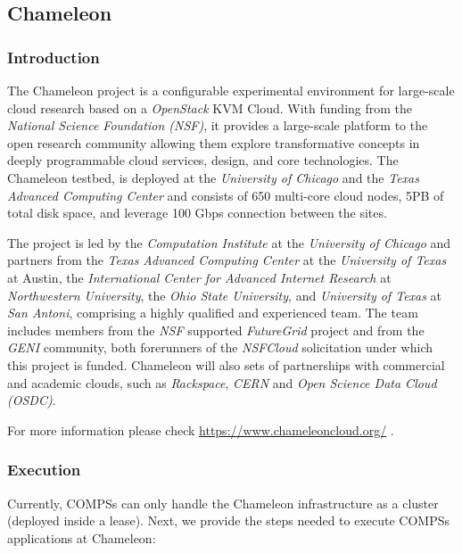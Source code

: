 \subsection{Chameleon}

\subsubsection{Introduction}

The Chameleon project is a configurable experimental environment for large-scale cloud research based on a \textit{OpenStack} 
KVM Cloud. With funding from the \textit{National Science Foundation (NSF)}, it provides a large-scale platform to the open research
community allowing them explore transformative concepts in deeply programmable cloud services, design, and core technologies. The 
Chameleon testbed, is deployed at the \textit{University of Chicago} and the \textit{Texas Advanced Computing Center} and consists of
650 multi-core cloud nodes, 5PB of total disk space, and leverage 100 Gbps connection between the sites. 

The project is led by the \textit{Computation Institute} at the \textit{University of Chicago} and partners from the \textit{Texas 
Advanced Computing Center} at the \textit{University of Texas} at Austin, the \textit{International Center for Advanced Internet 
Research} at \textit{Northwestern University}, the \textit{Ohio State University}, and \textit{University of Texas} at \textit{San
Antoni}, comprising a highly qualified and experienced team. The team includes members from the \textit{NSF} supported 
\textit{FutureGrid} project and from the \textit{GENI} community, both forerunners of the \textit{NSFCloud} solicitation under 
which this project is funded. Chameleon will also sets of partnerships with commercial and academic clouds, such as \textit{Rackspace},
\textit{CERN} and \textit{Open Science Data Cloud (OSDC)}.

For more information please check \url{https://www.chameleoncloud.org/} .

\subsubsection{Execution}
Currently, COMPSs can only handle the Chameleon infrastructure as a cluster (deployed inside a lease). Next, we provide the steps
needed to execute COMPSs applications at Chameleon:


